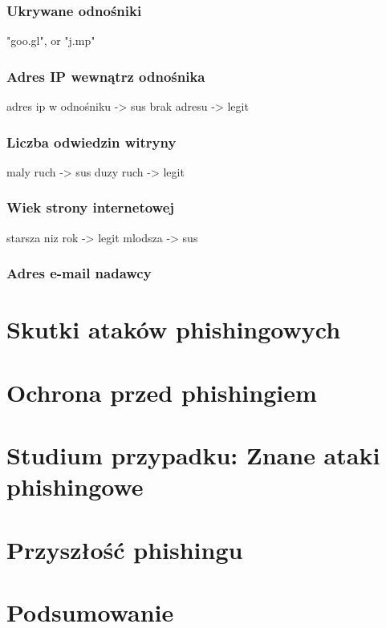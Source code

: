 \documentclass[]{article}
\begin{document}
\subsubsection{Ukrywane odnośniki}
"goo.gl", or "j.mp"

\subsubsection{Adres IP wewnątrz odnośnika}
adres ip w odnośniku -> sus
brak adresu -> legit

\subsubsection{Liczba odwiedzin witryny}
maly ruch -> sus
duzy ruch -> legit

\subsubsection{Wiek strony internetowej}
starsza niz rok -> legit
mlodsza -> sus

\subsubsection{Adres e-mail nadawcy}

\section{Skutki ataków phishingowych}

\newpage
\section{Ochrona przed phishingiem}

\newpage
\section{Studium przypadku: Znane ataki phishingowe}

\newpage
\section{Przyszłość phishingu}

\newpage
\section{Podsumowanie}

\newpage


\end{document}

